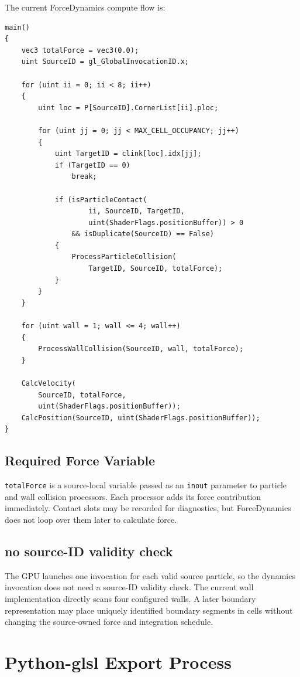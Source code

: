 The current ForceDynamics compute flow is:
\begin{verbatim}
main()
{
    vec3 totalForce = vec3(0.0);
    uint SourceID = gl_GlobalInvocationID.x;

    for (uint ii = 0; ii < 8; ii++)
    {
        uint loc = P[SourceID].CornerList[ii].ploc;

        for (uint jj = 0; jj < MAX_CELL_OCCUPANCY; jj++)
        {
            uint TargetID = clink[loc].idx[jj];
            if (TargetID == 0)
                break;

            if (isParticleContact(
                    ii, SourceID, TargetID,
                    uint(ShaderFlags.positionBuffer)) > 0
                && isDuplicate(SourceID) == False)
            {
                ProcessParticleCollision(
                    TargetID, SourceID, totalForce);
            }
        }
    }

    for (uint wall = 1; wall <= 4; wall++)
    {
        ProcessWallCollision(SourceID, wall, totalForce);
    }

    CalcVelocity(
        SourceID, totalForce,
        uint(ShaderFlags.positionBuffer));
    CalcPosition(SourceID, uint(ShaderFlags.positionBuffer));
}
\end{verbatim}

\subsection{Required Force Variable}

\texttt{totalForce} is a source-local variable passed as an \texttt{inout}
parameter to particle and wall collision processors.  Each processor adds its
force contribution immediately.  Contact slots may be recorded for
diagnostics, but ForceDynamics does not loop over them later to calculate
force.

\subsection{no source-ID validity check}

The GPU launches one invocation for each valid source particle, so the
dynamics invocation does not need a source-ID validity check.  The current
wall implementation directly scans four configured walls.  A later boundary
representation may place uniquely identified boundary segments in cells
without changing the source-owned force and integration schedule.

\section{Python-glsl Export Process}

